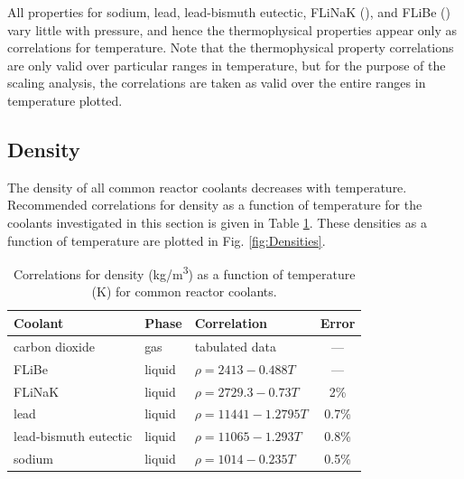 \documentclass[10pt]{article}
\numberwithin{equation}{section} %
\begin{document}
All properties for sodium, lead, lead-bismuth eutectic, FLiNaK (), and FLiBe () vary little with pressure, and hence the thermophysical properties appear only as correlations for temperature. Note that the thermophysical property correlations are only valid over particular ranges in temperature, but for the purpose of the scaling analysis, the correlations are taken as valid over the entire ranges in temperature plotted.

\subsection{Density}

The density of all common reactor coolants decreases with temperature. Recommended correlations for density as a function of temperature for the coolants investigated in this section is given in Table \ref{table:Densities}. These densities as a function of temperature are plotted in Fig. \ref{fig:Densities}.

\begin{table}[H]
\caption{Correlations for density (kg/m\textsuperscript{3}) as a function of temperature (K) for common reactor coolants.}
\centering
\begin{tabular}{l l l c}
\hline\hline
Coolant & Phase & Correlation & Error \\ [0.5ex]
\hline
carbon dioxide \cite{CO2}				& gas	& tabulated data			& ---\\
FLiBe \cite{saltproperties}				& liquid	& \(\rho=2413-0.488T\)		& ---\\
FLiNaK \cite{saltproperties}			& liquid	& \(\rho=2729.3-0.73T\)		& 2\%\\
lead \cite{LMproperties}				& liquid	& \(\rho=11441-1.2795T\)		& 0.7\%\\
lead-bismuth eutectic \cite{LMproperties}	& liquid	& \(\rho=11065-1.293T\)		& 0.8\%\\
sodium \cite{LMproperties}			& liquid 	& \(\rho=1014-0.235T\) 		& 0.5\%\\
\hline
\end{tabular}
\label{table:Densities}
\end{table}
\end{document}
